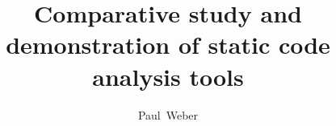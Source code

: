\documentclass[a4paper,oneside,10pt,english]{scrbook}
\begin{document}
\frontmatter


\title{Comparative study and demonstration of static code analysis tools}



\author{Paul~Weber }



\end{document}
